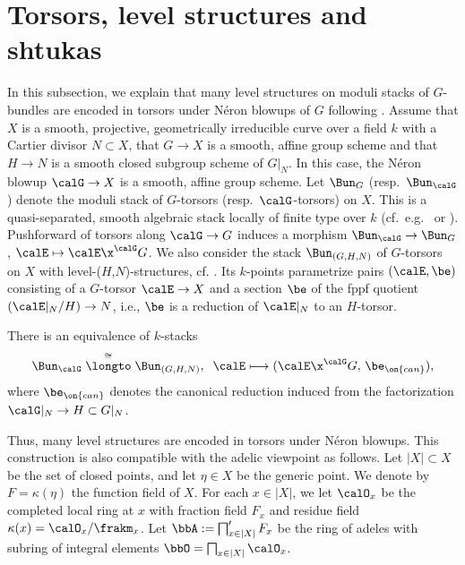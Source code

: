 \documentclass[10pt]{alggeom}
\theoremstyle{definition}
\numberwithin{equation}{section}
\begin{document}
 

\section{Torsors, level structures and shtukas} \label{Torsors.blowup.sec}

\label{TorShtuk}

In this subsection, we explain that many level structures
on moduli stacks of $G$-bundles are encoded in torsors under Néron blowups of $G$ following \cite{MRR20}.
Assume that $X$ is a smooth, projective, geometrically irreducible curve
over a field $k$ with a Cartier divisor $N\subset X$, that $G\to X$ is a
smooth, affine group scheme and that $H\to N$ is a smooth closed subgroup
scheme of $G|_N$. In this case, the N\'eron blowup $\calG\to X$ is a smooth,
affine group scheme. Let $\Bun_G$ (resp.~$\Bun_\calG$) denote the moduli
stack of $G$-torsors (resp.~$\calG$-torsors) on $X$.  This is a quasi-separated,
smooth algebraic stack locally of finite type over $k$
(cf.~e.g.~\cite[Prop.~1]{He10} or \cite[Thm.~2.5]{AH19}).
Pushforward of torsors along $\calG\to G$ induces a morphism
$\Bun_\calG\to \Bun_G$, $\calE\mapsto \calE\x^\calG G$.
We also consider the stack $\Bun_{(G,H,N)}$ of $G$-torsors on $X$ with level-($H$,$N$)-structures, cf. \cite[Definition 4.5]{MRR20}.
Its $k$-points parametrize pairs $(\calE,\be)$ consisting of a $G$-torsor $\calE\to X$ and a section $\be$ of the fppf quotient $(\calE|_{N}/H)\to N$, i.e., $\be$ is a reduction of $\calE|_N$ to an $H$-torsor.

  \label{torsorprop}
 There is an equivalence of $k$-stacks
\[
\Bun_\calG\;\overset{\cong}{\longto}\;\Bun_{(G,H,N)},\;\; \calE\longmapsto (\calE\x^\calG G,\, \be_{\on{can}}),
\]
where $\be_{\on{can}}$ denotes the canonical reduction induced from the factorization $\calG|_N\to H\subset G|_N$. 
\xprop


Thus, many level structures are encoded in torsors under N\'eron blowups.
This construction is also compatible with the adelic viewpoint as follows. Let $|X|\subset X$ be the set of closed points, and let $\eta \in X$ be the generic point.
We denote by $F=\kappa(\eta)$ the function field of $X$.
For each $x\in |X|$, we let $\calO_x$ be the completed local ring at $x$ with fraction field $F_x$ and residue field $\kappa(x)=\calO_x/\frakm_x$. 
Let $\bbA:=\bigsqcap'_{x\in |X|}F_x$ be the ring of adeles with subring of integral elements $\bbO=\bigsqcap_{x\in |X|}\calO_x$.
\end{document}
